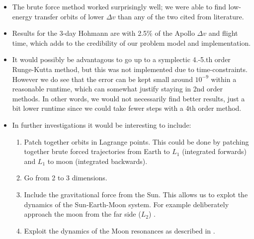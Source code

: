 \begin{itemize}
    \item The brute force method worked surprisingly well; we were able to find low-energy transfer orbits of lower $\Delta v$ than any of the two cited from literature.
    \item Results for the 3-day Hohmann are with 2.5\% of the Apollo $\Delta v$ and flight time, which adds to the credibility of our problem model and implementation.
    \item It would possibly be advantagous to go up to a symplectic 4.-5.th order Runge-Kutta method, but this was not implemented due to time-constraints. However we do see that the error can be kept small around $10^{-9}$ within a reasonable runtime, which can somewhat justify staying in 2nd order methods. In other words, we would not necessarily find better results, just a bit lower runtime since we could take fewer steps with a 4th order method.
    \item In further investigations it would be interesting to include:
    \begin{enumerate}
        \item Patch together orbits in Lagrange points. This could be done by patching together brute forced trajectories from Earth to $L_1$ (integrated forwards) and $L_1$ to moon (integrated backwards).
        \item Go from 2 to 3 dimensions.
        \item Include the gravitational force from the Sun. This allows us to explot the dynamics of the Sun-Earth-Moon system. For example deliberately approach the moon from the far side ($L_2$) \cite{Koon2001}.
        \item Exploit the dynamics of the Moon resonances as described in \cite{Topputo2005}.
    \end{enumerate}
\end{itemize}

